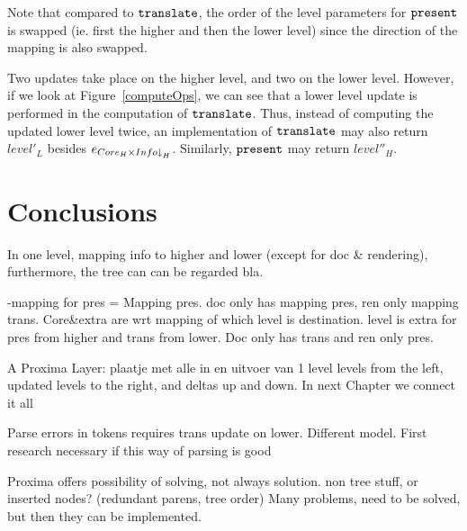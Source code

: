 Note that compared to ${\tt translate}$, the order of the level parameters for 
${\tt present}$ is swapped (ie. first the higher and then the lower level) since the direction of the mapping is also swapped. 

Two updates take place on the higher level, and two on the lower level. However, if we look at Figure~\ref{computeOps}, we can see that a lower level update is performed in the computation of
 ${\tt translate}$. Thus, instead of computing the updated lower level twice, an implementation of 
 ${\tt translate}$ may also return $level'_{L}$ besides $e_{Core_{H} \times Info\idwn_{H}}$.  Similarly, ${\tt present}$ may return $level''_{H}$. 
 



%																
\section{Conclusions}

\toHere     %

In one level,  mapping info to higher and lower (except for doc \& rendering), furthermore, the tree can can be regarded bla.

-mapping for pres = Mapping pres. doc only has mapping pres, ren only mapping trans. Core\&extra are wrt mapping of which level is destination. level is extra for pres from higher and trans from lower. Doc only has trans  and ren only pres.

A Proxima Layer:
plaatje met alle in en uitvoer van 1 level
levels from the left, updated levels to the right, and deltas up and down. In next Chapter we connect it all


Parse errors in tokens requires trans update on lower. Different model. First research necessary if this way of parsing is good

Proxima offers possibility of solving, not always solution. non tree stuff, or inserted nodes? (redundant parens, tree order) Many problems, need to be solved, but then they can be implemented.



